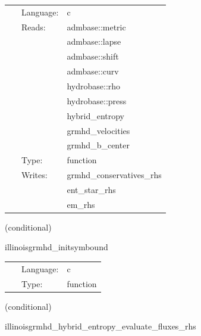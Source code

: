 \documentclass{article}
\begin{document}
 \begin{tabular*}{160mm}{cll} 
~ & Language:  & c \\ 
~ & Reads:  & admbase::metric \\ 
~& ~ &admbase::lapse\\ 
~& ~ &admbase::shift\\ 
~& ~ &admbase::curv\\ 
~& ~ &hydrobase::rho\\ 
~& ~ &hydrobase::press\\ 
~& ~ &hybrid\_entropy\\ 
~& ~ &grmhd\_velocities\\ 
~& ~ &grmhd\_b\_center\\ 
~ & Type:  & function \\ 
~ & Writes:  & grmhd\_conservatives\_rhs \\ 
~& ~ &ent\_star\_rhs\\ 
~& ~ &em\_rhs\\ 
\end{tabular*} 


\vspace{5mm}

   (conditional) 

\hspace{5mm} illinoisgrmhd\_initsymbound 

\hspace{5mm}{\it schedule symmetries } 


\hspace{5mm}

 \begin{tabular*}{160mm}{cll} 
~ & Language:  & c \\ 
~ & Type:  & function \\ 
\end{tabular*} 


\vspace{5mm}

   (conditional) 

\hspace{5mm} illinoisgrmhd\_hybrid\_entropy\_evaluate\_fluxes\_rhs 

\hspace{5mm}{\it entropy+hybrid version of illinoisgrmhd\_evaluate\_fluxes\_rhs } 


\hspace{5mm}
\end{document}
